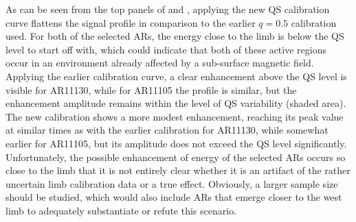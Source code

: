 \documentclass{aa}
\begin{document}
As can be seen
from the top panels of  and , 
applying the new QS calibration curve flattens the signal profile in comparison to the
earlier $q=0.5$ calibration used. For both of the selected ARs, the \fff energy close to the limb is below the QS level to start off with, which could indicate that both of these active regions occur in an environment
already affected by a sub-surface magnetic field. 
Applying the earlier calibration curve, a clear enhancement above the QS level is visible for AR11130, while for AR11105 the profile is similar, but the enhancement amplitude remains within the level of QS variability (shaded area). The new calibration shows a more modest enhancement, reaching its peak value at similar times as with the earlier calibration for AR11130, while somewhat earlier for AR11105, but its amplitude does not exceed the QS level significantly. Unfortunately, the possible enhancement of \fff energy of the selected ARs occurs so close to the limb that it is not entirely clear whether it is an artifact of the rather uncertain limb calibration data or a true effect. Obviously, a larger sample size should be studied, which would also include ARs that emerge closer to the west limb to adequately substantiate or refute this scenario.  


\end{document}
